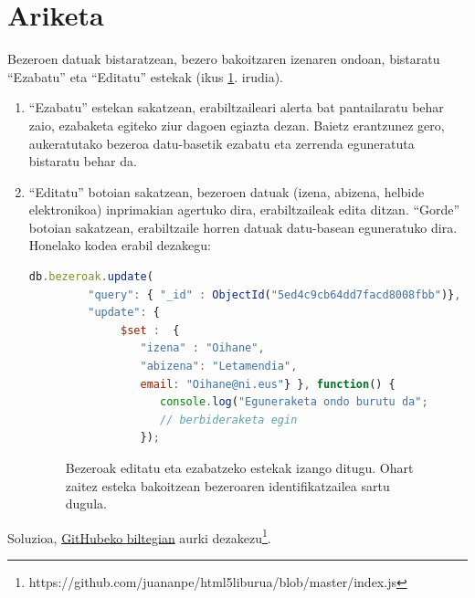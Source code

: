 \section{Ariketa}
 
 Bezeroen datuak bistaratzean, bezero bakoitzaren izenaren ondoan, bistaratu ``Ezabatu'' eta ``Editatu'' estekak  (ikus \ref{fig:bezeroakeditatu}. irudia).
 
 
\begin{enumerate}
     \item ``Ezabatu'' estekan sakatzean, erabiltzaileari alerta bat pantailaratu behar zaio, ezabaketa egiteko ziur dagoen egiazta dezan. Baietz erantzunez gero, aukeratutako bezeroa datu-basetik ezabatu eta zerrenda eguneratuta bistaratu behar da.
     \item ``Editatu'' botoian sakatzean, bezeroen datuak (izena, abizena, helbide elektronikoa) inprimakian agertuko dira, erabiltzaileak edita ditzan. ``Gorde'' botoian sakatzean, erabiltzaile horren datuak datu-basean eguneratuko dira. Honelako kodea erabil dezakegu:
     
     \begin{lstlisting}[language=JavaScript]
     db.bezeroak.update( 
         "query": { "_id" : ObjectId("5ed4c9cb64dd7facd8008fbb")},
         "update": { 
              $set :  { 
                 "izena" : "Oihane", 
                 "abizena": "Letamendia", 
                 email: "Oihane@ni.eus"} }, function() {
                    console.log("Eguneraketa ondo burutu da";
                    // berbideraketa egin
                 });
     \end{lstlisting}
     
     
 \begin{figure}[ht]
 \centering
 \caption{Bezeroak editatu eta ezabatzeko estekak izango ditugu. Ohart zaitez esteka bakoitzean bezeroaren identifikatzailea sartu dugula.}
 \label{fig:bezeroakeditatu}
 \end{figure}
 
 \end{enumerate}  
 
 Soluzioa, \href{https://github.com/juananpe/html5liburua/blob/master/index.js}{GitHubeko biltegian} aurki dezakezu\footnote{https://github.com/juananpe/html5liburua/blob/master/index.js}.